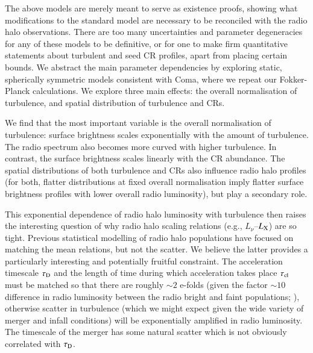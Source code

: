 \documentclass[fleqn,usenatbib,useAMS]{mnras}
\begin{document}
The above models are merely meant to serve as existence proofs, showing what
modifications to the standard model are necessary to be reconciled with the
radio halo observations. There are too many uncertainties and parameter
degeneracies for any of these models to be definitive, or for one to make firm
quantitative statements about turbulent and seed CR profiles, apart from placing
certain bounds. We abstract the main parameter dependencies by exploring static,
spherically symmetric models consistent with Coma, where we repeat our
Fokker-Planck calculations. We explore three main effects: the overall
normalisation of turbulence, and spatial distribution of turbulence and CRs.

We find that the most important variable is the overall normalisation of
turbulence: surface brightness scales exponentially with the amount of
turbulence. The radio spectrum also becomes more curved with higher
turbulence. In contrast, the surface brightness scales linearly with the CR
abundance.  The spatial distributions of both turbulence and CRs also influence
radio halo profiles (for both, flatter distributions at fixed overall
normalisation imply flatter surface brightness profiles with lower overall radio
luminosity), but play a secondary role.

This exponential dependence of radio halo luminosity with turbulence then raises
the interesting question of why radio halo scaling relations (e.g.,
$L_{\nu}$--$L_{\rm X}$) are so tight. Previous statistical modelling of radio
halo populations \citep{2006MNRAS.369.1577C,2007MNRAS.378.1565C} have focused
on matching the mean relations, but not the scatter. We believe the latter
provides a particularly interesting and potentially fruitful constraint. The
acceleration timescale $\tau_{\rm D}$ and the length of time during which
acceleration takes place $\tau_{\rm cl}$ must be matched so that there are
roughly $\sim 2$ e-folds (given the factor $\sim 10$ difference in radio
luminosity between the radio bright and faint populations; \citet{brown11}),
otherwise scatter in turbulence (which we might expect given the wide variety of
merger and infall conditions) will be exponentially amplified in radio
luminosity. The timescale of the merger has some natural scatter which is not
obviously correlated with $\tau_{\rm D}$. 
\end{document}
